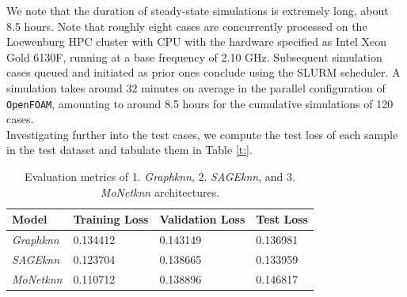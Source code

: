 We note that the duration of steady-state simulations is extremely long, about 8.5 hours. Note that roughly eight cases are concurrently processed on the Loewenburg HPC cluster with \gls{CPU} with the hardware specified as Intel Xeon Gold 6130F, running at a base frequency of 2.10 GHz. Subsequent simulation cases queued and initiated as prior ones conclude using the \gls{SLURM} scheduler. A simulation takes around 32 minutes on average in the parallel configuration of \verb |OpenFOAM|, amounting to around 8.5 hours for the cumulative simulations of 120 cases. \\
Investigating further into the test cases, we compute the test loss of each sample in the test dataset and tabulate them in Table \ref{t:}.
\begin{table}[ht]
    \centering
    \caption{Evaluation metrics of  1. \textit{Graphknn}, 2. \textit{SAGEknn}, and 3. \textit{MoNetknn} architectures. } 
    \label{t:predloss}
    \begin{tabular}{|l|l|l|l|}
    \hline
    \textbf{Model} & \textbf{Training Loss} & \textbf{Validation Loss} & \textbf{Test Loss}\\
    \hline
     \textit{Graphknn} & 0.134412& 0.143149 & 0.136981   \\
    \hline
    \textit{SAGEknn}& 0.123704 & 0.138665 & 0.133959 \\
    \hline
    \textit{MoNetknn} & 0.110712  & 0.138896 & 0.146817  \\
    \hline
    \end{tabular}
\end{table}
